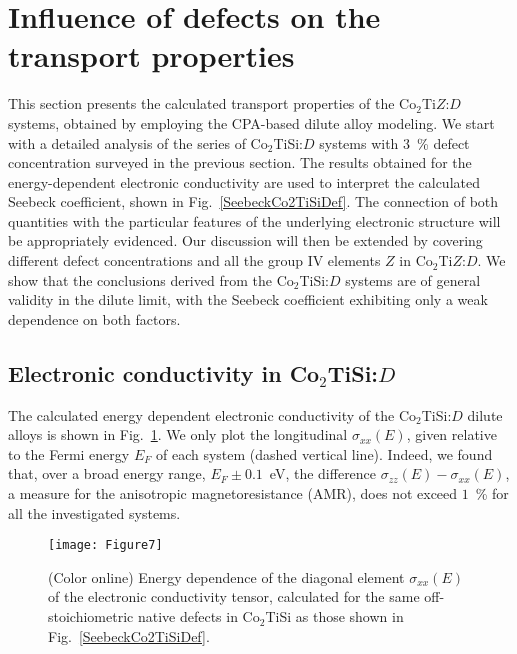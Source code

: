 \documentclass[aps,prb,twocolumn,superscriptaddress,showpacs]{revtex4}
\newcommand{\FG}[1]{Fig.~\ref{#1}}
\newcommand{\bm}[1]{\mbox{\boldmath$#1$}}
\begin{document}
\section{Influence of defects on the transport 
          properties}\label{SecTransport}

This section presents the calculated 
transport properties of the Co$_2$Ti$Z$:$D$ systems,
obtained by employing the CPA-based 
dilute alloy modeling.
We start with a detailed analysis of the
series of Co$_2$TiSi:$D$
systems with $3$~\% defect concentration
surveyed in the previous section.
The results obtained
for the energy-dependent electronic conductivity
are used to interpret the calculated Seebeck coefficient,
shown in \FG{SeebeckCo2TiSiDef}. 
The connection of both quantities with the
particular features of the underlying electronic structure 
will be appropriately evidenced. Our discussion will then be 
extended by covering different defect concentrations
and all the group IV elements $Z$ in Co$_2$Ti$Z$:$D$.
We show that the conclusions derived from the 
Co$_2$TiSi:$D$ systems are of general validity
in the dilute limit, with 
the Seebeck coefficient exhibiting only a weak 
dependence on both factors.

\subsection{Electronic conductivity  in Co\bm{_2}TiSi:\bm{D}}

The calculated energy dependent 
electronic conductivity of the Co$_2$TiSi:$D$
dilute alloys is shown in \FG{SigmaXXCo2TiSiDef}.
We only plot the 
longitudinal $\sigma_{xx}(E)$,
given relative to the Fermi energy $E_F$ of each system 
(dashed vertical line). 
Indeed, we found that, 
over a broad energy range, $E_F\pm 0.1$~eV, the difference
$\sigma_{zz}(E)-\sigma_{xx}(E)$,
a measure for the anisotropic magnetoresistance (AMR),
does not exceed $1$~\% for all the investigated
systems. 


\begin{figure}
 \texttt{[image: Figure7]}
 \caption{(Color online)
  Energy dependence of the diagonal element $\sigma_{xx}(E)$ of
  the electronic conductivity tensor, 
  calculated for the same off-stoichiometric native defects in 
  Co$_2$TiSi as those shown in \protect\FG{SeebeckCo2TiSiDef}.}
 \label{SigmaXXCo2TiSiDef}
\end{figure}
\end{document}
